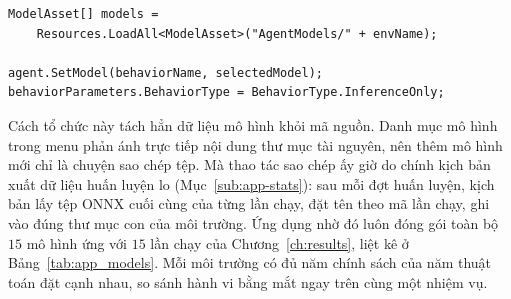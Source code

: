 \begin{lstlisting}[language={[Sharp]C}, caption={Liệt kê và gán mô hình ONNX tại thời gian chạy}]
ModelAsset[] models =
    Resources.LoadAll<ModelAsset>("AgentModels/" + envName);

agent.SetModel(behaviorName, selectedModel);
behaviorParameters.BehaviorType = BehaviorType.InferenceOnly;
\end{lstlisting}

\indent Cách tổ chức này tách hẳn dữ liệu mô hình khỏi mã nguồn. Danh mục mô hình trong
menu phản ánh trực tiếp nội dung thư mục tài nguyên, nên thêm mô hình mới chỉ là chuyện
sao chép tệp. Mà thao tác sao chép ấy giờ do chính kịch bản xuất dữ liệu huấn luyện lo
(Mục~\ref{sub:app-stats}): sau mỗi đợt huấn luyện, kịch bản lấy tệp ONNX cuối cùng của
từng lần chạy, đặt tên theo mã lần chạy, ghi vào đúng thư mục con của môi trường. Ứng dụng
nhờ đó luôn đóng gói toàn bộ $15$ mô hình ứng với $15$ lần chạy của
Chương~\ref{ch:results}, liệt kê ở Bảng~\ref{tab:app_models}. Mỗi môi trường có đủ năm
chính sách của năm thuật toán đặt cạnh nhau, so sánh hành vi bằng mắt ngay trên cùng một
nhiệm vụ.

